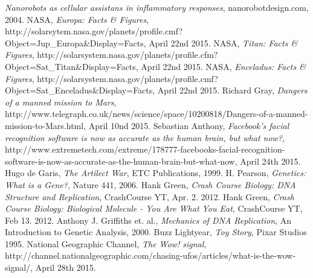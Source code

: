 \begin{thebibliography}{99}
		\emph{Nanorobots as cellular assistans in inflammatory responses},
		nanorobotdesign.com,
		2004.
		NASA,
		\emph{Europa: Facts \& Figures},
		http://solarsytem.nasa.gov/planets/profile.cmf?Object=Jup\_Europa\&Display=Facts,
		April 22nd 2015.
		NASA,
		\emph{Titan: Facts \& Figures},
		http://solarsystem.nasa.gov/planets/profile.cfm?Object=Sat\_Titan\&Display=Facts,
		April 22nd 2015.
		NASA,
		\emph{Enceladus: Facts \& Figures},
		http://solarsystem.nasa.gov/planets/profile.cmf?Object=Sat\_Enceladus\&Display=Facts,
		April 22nd 2015.
		Richard Gray,
		\emph{Dangers of a manned mission to Mars},
		http://www.telegraph.co.uk/news/science/space/10200818/Dangers-of-a-manned-mission-to-Mars.html,
		April 10nd 2015.
		Sebastian Anthony,
		\emph{Facebook’s facial recognition software is now as accurate as the human brain, but what now?},
		http://www.extremetech.com/extreme/178777-facebooks-facial-recognition-software-is-now-as-accurate-as-the-human-brain-but-what-now,
		April 24th 2015.
		Hugo de Garis,
		\emph{The Artilect War},
		ETC Publications,
		1999.
		H. Pearson,
		\emph{Genetics: What is a Gene?},
		Nature 441,
		2006.
		Hank Green,
		\emph{Crash Course Biology: DNA Structure and Replication},
		CrashCourse YT,
		Apr. 2. 2012.
		Hank Green,
		\emph{Crash Course Biology: Biological Molecule - You Are What You Eat},
		CrashCourse YT,
		Feb 13. 2012.
		Anthony J. Griffiths et. al.,
		\emph{Mechanics of DNA Replication},
		An Introduction to Genetic Analysis,
		2000.
		Buzz Lightyear,
		\emph{Toy Story},
		Pixar Studios 1995.
		National Geographic Channel,
		\emph{The Wow! signal},
		http://channel.nationalgeographic.com/chasing-ufos/articles/what-is-the-wow-signal/,
		April 28th 2015.
\end{thebibliography}